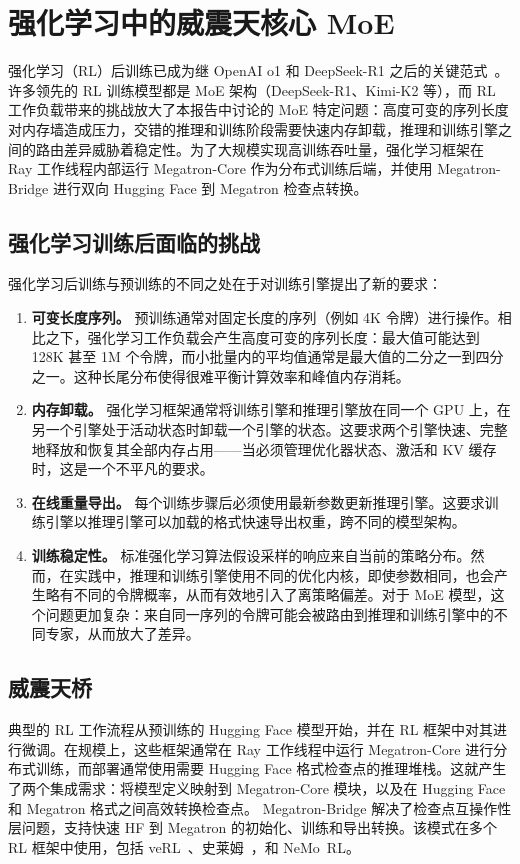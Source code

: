 \section{强化学习中的威震天核心 MoE}\label{sec:rl}
强化学习（RL）后训练已成为继 OpenAI o1 和 DeepSeek-R1 之后的关键范式~\cite{deepseekai2025deepseekr1}。许多领先的 RL 训练模型都是 MoE 架构（DeepSeek-R1、Kimi-K2 等），而 RL 工作负载带来的挑战放大了本报告中讨论的 MoE 特定问题：高度可变的序列长度对内存墙造成压力，交错的推理和训练阶段需要快速内存卸载，推理和训练引擎之间的路由差异威胁着稳定性。为了大规模实现高训练吞吐量，强化学习框架在 Ray 工作线程内部运行 Megatron-Core 作为分布式训练后端，并使用 Megatron-Bridge 进行双向 Hugging Face 到 Megatron 检查点转换。

\subsection{强化学习训练后面临的挑战}
强化学习后训练与预训练的不同之处在于对训练引擎提出了新的要求：

\begin{enumerate}
    \item \textbf{可变长度序列。} 预训练通常对固定长度的序列（例如 4K 令牌）进行操作。相比之下，强化学习工作负载会产生高度可变的序列长度：最大值可能达到 128K 甚至 1M 个令牌，而小批量内的平均值通常是最大值的二分之一到四分之一。这种长尾分布使得很难平衡计算效率和峰值内存消耗。
    \item \textbf{内存卸载。} 强化学习框架通常将训练引擎和推理引擎放在同一个 GPU 上，在另一个引擎处于活动状态时卸载一个引擎的状态。这要求两个引擎快速、完整地释放和恢复其全部内存占用——当必须管理优化器状态、激活和 KV 缓存时，这是一个不平凡的要求。
    \item \textbf{在线重量导出。} 每个训练步骤后必须使用最新参数更新推理引擎。这要求训练引擎以推理引擎可以加载的格式快速导出权重，跨不同的模型架构。
    \item \textbf{训练稳定性。} 标准强化学习算法假设采样的响应来自当前的策略分布。然而，在实践中，推理和训练引擎使用不同的优化内核，即使参数相同，也会产生略有不同的令牌概率，从而有效地引入了离策略偏差。对于 MoE 模型，这个问题更加复杂：来自同一序列的令牌可能会被路由到推理和训练引擎中的不同专家，从而放大了差异。
\end{enumerate}
\subsection{威震天桥}
典型的 RL 工作流程从预训练的 Hugging Face 模型开始，并在 RL 框架中对其进行微调。在规模上，这些框架通常在 Ray 工作线程中运行 Megatron-Core 进行分布式训练，而部署通常使用需要 Hugging Face 格式检查点的推理堆栈。这就产生了两个集成需求：将模型定义映射到 Megatron-Core 模块，以及在 Hugging Face 和 Megatron 格式之间高效转换检查点。 Megatron-Bridge 解决了检查点互操作性层问题，支持快速 HF 到 Megatron 的初始化、训练和导出转换。该模式在多个 RL 框架中使用，包括 veRL~\cite{sheng2024hybridflow}、史莱姆~\cite{slime_github}，和 NeMo~RL。

